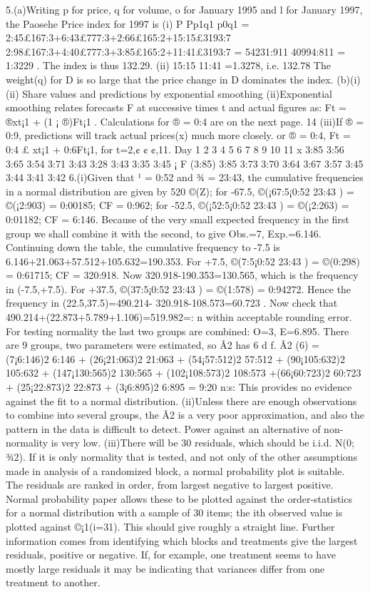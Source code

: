 5.(a)Writing p for price, q for volume, o for January 1995 and l for January 1997, the Paosehe
Price index for 1997 is
(i)
P
Pp1q1
p0q1
= 2:45£167:3+6:43£777:3+2:66£165:2+15:15£3193:7
2:98£167:3+4:40£777:3+3:85£165:2+11:41£3193:7
= 54231:911
40994:811 = 1:3229
.
The index is thus 132.29.
(ii) 15:15
11:41 =1.3278, i.e. 132.78%
The weight(q) for D is so large that the price change in D dominates the index.
(b)(i) (ii)
Share values and predictions by exponential smoothing
(ii)Exponential smoothing relates forecasts F at successive times t and actual figures as:
Ft = ®xt¡1 + (1 ¡ ®)Ft¡1
.
Calculations for ® = 0:4 are on the next page.
14
(iii)If ® = 0:9, predictions will track actual prices(x) much more closely.
or ® = 0:4, Ft = 0:4 £ xt¡1 + 0:6Ft¡1, for t=2,¢ ¢ ¢,11.
Day 1 2 3 4 5 6 7 8 9 10 11
x 3:85 3:56 3:65 3:54 3:71 3:43 3:28 3:43 3:35 3:45 ¡
F (3:85) 3:85 3:73 3:70 3:64 3:67 3:57 3:45 3:44 3:41 3:42
6.(i)Given that ¹ = 0:52 and ¾ = 23:43, the cumulative frequencies in a normal distribution are
given by 520 ©(Z);
for -67.5, ©(¡67:5¡0:52
23:43 ) = ©(¡2:903) = 0:00185; CF = 0:962;
for -52.5, ©(¡52:5¡0:52
23:43 ) = ©(¡2:263) = 0:01182; CF = 6:146.
Because of the very small expected frequency in the first group we shall combine it with the
second, to give Obs.=7, Exp.=6.146. Continuing down the table, the cumulative frequency to -7.5
is 6.146+21.063+57.512+105.632=190.353.
For +7.5, ©(7:5¡0:52
23:43 ) = ©(0:298) = 0:61715; CF = 320:918.
Now 320.918-190.353=130.565, which is the frequency in (-7.5,+7.5).
For +37.5, ©(37:5¡0:52
23:43 ) = ©(1:578) = 0:94272. Hence the frequency in (22.5,37.5)=490.214-
320.918-108.573=60.723 .
Now check that 490.214+(22.873+5.789+1.106)=519.982=: n within acceptable rounding error.
For testing normality the last two groups are combined: O=3, E=6.895.
There are 9 groups, two parameters were estimated, so Â2 has 6 d f.
Â2
(6) = (7¡6:146)2
6:146 + (26¡21:063)2
21:063 + (54¡57:512)2
57:512 + (90¡105:632)2
105:632 + (147¡130:565)2
130:565 + (102¡108:573)2
108:573
+(66¡60:723)2
60:723 + (25¡22:873)2
22:873 + (3¡6:895)2
6:895 = 9:20 n:s:
This provides no evidence against the fit to a normal distribution.
(ii)Unless there are enough observations to combine into several groups, the Â2 is a very poor
approximation, and also the pattern in the data is difficult to detect. Power against an alternative
of non-normality is very low.
(iii)There will be 30 residuals, which should be i.i.d. N(0; ¾2). If it is only normality that is
tested, and not only of the other assumptions made in analysis of a randomized block, a normal
probability plot is suitable. The residuals are ranked in order, from largest negative to largest positive.
Normal probability paper allows these to be plotted against the order-statistics for a normal
distribution with a sample of 30 items; the ith observed value is plotted against ©¡1(i=31). This
should give roughly a straight line. Further information comes from identifying which blocks and
treatments give the largest residuals, positive or negative. If, for example, one treatment seems to
have mostly large residuals it may be indicating that variances differ from one treatment to another.
